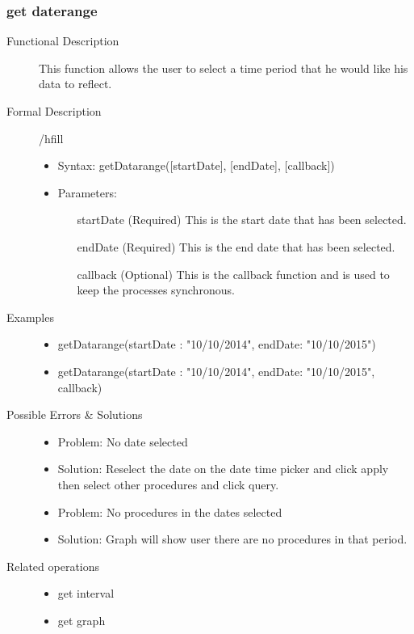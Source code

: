 \documentclass[14pt, a4paper]{article}
\begin{document}
\subsubsection{get daterange}
\begin{description}
\item[Functional Description] This function allows the user to select a time period that he would like his data to reflect.
\item[Formal Description]/hfill
\begin{itemize}
	\item Syntax: getDatarange([startDate], [endDate], [callback])\\
	\item Parameters:
		\begin{itemize}
			\item [startDate](Required) This is the start date that has been selected.
			\item [endDate](Required) This is the end date that has been selected.
			\item [callback](Optional) This is the callback function and is used to keep the processes synchronous.
		\end{itemize}
\end{itemize}
\item[Examples]\hfill
\begin{itemize}
	\item getDatarange({startDate : "10/10/2014", endDate: "10/10/2015"})
	\item getDatarange({startDate : "10/10/2014", endDate: "10/10/2015"}, callback)
\end{itemize}
\item[Possible Errors \& Solutions]
\begin{itemize}
	\item Problem: No date selected
	\item Solution: Reselect the date on the date time picker and click apply then select other procedures and click query.
	\item Problem: No procedures in the dates selected
	\item Solution: Graph will show user there are no procedures in that period.
\end{itemize}
\item[Related operations] \hfill
\begin{itemize}
	\item get interval
	\item get graph
\end{itemize}
\end{description}
\end{document}
